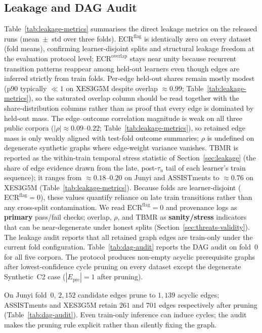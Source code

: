 \documentclass[pdflatex,sn-mathphys-num]{sn-jnl}
\newcommand{\Epre}{\ensuremath{E_{\text{pre}}}}
\begin{document}
\subsection{Leakage and DAG Audit}
\label{sec:exp-audit}


Table~\ref{tab:leakage-metrics} summarises the direct leakage metrics on
the released runs (mean~$\pm$~std over three folds). $\mathrm{ECR}^{\mathrm{flag}}$ is identically zero on every dataset (fold means), confirming learner-disjoint splits and structural leakage freedom at the evaluation protocol level; $\mathrm{ECR}^{\mathrm{overlap}}$ stays near unity because recurrent transition patterns reappear among held-out learners even though edges are inferred strictly from train folds.
Per-edge held-out shares remain mostly modest (p90 typically ${\ll}1$ on XES3G5M despite overlap ${\approx}0.99$; Table~\ref{tab:leakage-metrics}), so the saturated overlap column should be read together with the share-distribution columns rather than as proof that every edge is dominated by held-out mass.
The edge--outcome correlation magnitude is weak on all three public corpora
($|\rho|{\approx}0.09$--$0.22$; Table~\ref{tab:leakage-metrics}), so retained
edge mass is only weakly aligned with test-fold outcome summaries; $\rho$ is
undefined on degenerate synthetic graphs where edge-weight variance vanishes. $\mathrm{TBMR}$
is reported as the within-train temporal stress statistic of
Section~\ref{sec:leakage} (the share of edge evidence drawn from the
late, post-$\tau_u$ tail of each learner's train sequence); it ranges from
${\approx}0.18$--$0.20$ on Junyi and ASSISTments to ${\approx}0.76$ on
XES3G5M (Table~\ref{tab:leakage-metrics}). Because folds are learner-disjoint
($\mathrm{ECR}^{\mathrm{flag}}{=}0$), these values quantify reliance on
late train transitions rather than any cross-split contamination. We read
$\mathrm{ECR}^{\mathrm{flag}}{=}0$ and provenance logs as \textbf{primary}
pass/fail checks; overlap, $\rho$, and $\mathrm{TBMR}$ as
\textbf{sanity/stress} indicators that can be near-degenerate under honest
splits (Section~\ref{sec:threats-validity}).
The leakage audit reports that all retained graph edges are train-only
under the current fold configuration. Table~\ref{tab:dag-audit} reports
the DAG audit on fold~0 for all five corpora. The protocol produces
non-empty acyclic prerequisite graphs after lowest-confidence cycle
pruning on every dataset except the degenerate Synthetic~C2 case
($|\Epre|{=}1$ after pruning).

On Junyi fold~0, $2{,}152$ candidate edges prune to $1{,}139$ acyclic edges;
ASSISTments and XES3G5M retain $261$ and $701$ edges respectively after pruning
(Table~\ref{tab:dag-audit}). Even train-only inference can induce cycles; the
audit makes the pruning rule explicit rather than silently fixing the graph.
\end{document}
